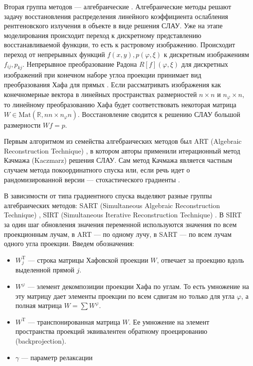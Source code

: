 Вторая группа методов --- алгебраические \cite{algebraic_methods}. 
Алгебраические методы решают задачу восстановления распределения линейного коэффициента ослабления рентгеновского излучения в объекте в виде решения СЛАУ.
Уже на этапе моделирования происходит переход к дискретному представлению восстанавливаемой функции, то есть к растровому изображению.
Происходит переход от непрерывных функций $f(x,y), p(\varphi, \xi)$ к дискретным изображениям $f_{ij}, p_{kj}$.
Непрерывное преобразование Радона $R[f](\varphi, \xi)$ для дискретных изображений при конечном наборе углоа проекции принимает вид преобразования Хафа для прямых \cite{Ginkel04ashort}.
Если рассматривать изображения как конечномерные вектора в линейных пространствах размерностей $n \times n$ и $n_\varphi \times n$, то линейному преобразованию Хафа будет соответствовать некоторая матрица $W \in \mathrm{Mat}(\mathbb R, n n \times n_\varphi n)$.
Восстановление сводится к решению СЛАУ большой размерности $Wf = p$.

Первым алгоритмом из семейства алгебраических методов был ART (Algebraic Reconstruction Technique) \cite{GORDON1970471}, в котором авторы применили итерационный метод Качмажа (Kaczmarz) \cite{Kaczmarz1937} решения СЛАУ.
Сам метод Качмажа является частным случаем метода покоординатного спуска или, если речь идет о рандомизированной версии --- стохастического градиенты \cite{needell2014stochastic}.

В зависимости от типа градиентного спуска выделяют разные группы алгебраических методов: SART (Simultaneous Algebraic Reconstruction Technique) \cite{sart}, SIRT (Simultaneous Iterative Reconstruction Technique) \cite{GILBERTSIRT, gregor2008computational}.
В SIRT за один шаг обновления значения переменной используются значения по всем проекционным лучам, в ART --- по одному лучу, в SART --- по всем лучам одного угла проекции.
Введем обозначения: 

\begin{itemize}
  \item $W^{\mathrm T}_j$ --- строка матрицы Хафовской проекции $W$, отвечает за проекцию вдоль выделенной прямой $j$.
  \item $W^\varphi$ --- элемент декомпозиции проекции Хафа по углам. То есть умножение на эту матрицу дает элементы проекции по всем сдвигам но только для угла $\varphi$, а полная матрица $W = \sum W^\varphi$.
  \item $W^{\mathrm T}$ --- транспонированная матрица $W$. Ее умножение на элемент пространства проекций эквивалентен обратному проецированию (backprojection).
  \item $\gamma$ --- параметр релаксации
\end{itemize}

